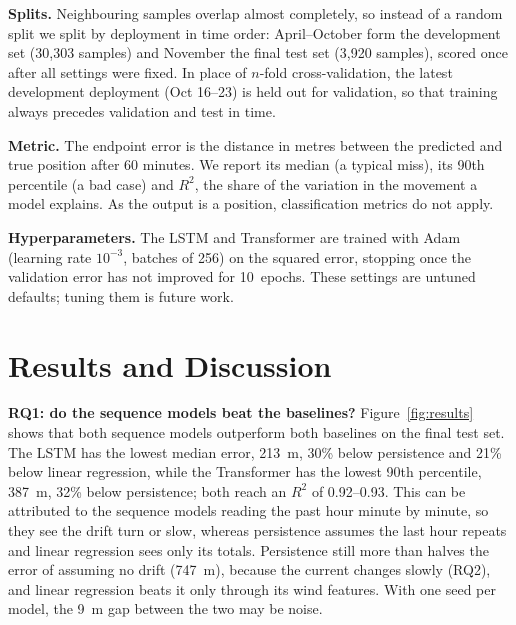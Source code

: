 \documentclass[sigconf]{acmart}
\begin{document}
\textbf{Splits.} Neighbouring samples overlap almost completely, so instead of a random split we split by deployment in time order: April--October form the development set (30{,}303 samples) and November the final test set (3{,}920 samples), scored once after all settings were fixed. In place of $n$-fold cross-validation, the latest development deployment (Oct 16--23) is held out for validation, so that training always precedes validation and test in time.

\textbf{Metric.} The endpoint error is the distance in metres between the predicted and true position after 60 minutes. We report its median (a typical miss), its 90th percentile (a bad case) and $R^2$, the share of the variation in the movement a model explains. As the output is a position, classification metrics do not apply.

\textbf{Hyperparameters.} The LSTM and Transformer are trained with Adam~\cite{kingma2015adam} (learning rate $10^{-3}$, batches of 256) on the squared error, stopping once the validation error has not improved for 10~epochs. These settings are untuned defaults; tuning them is future work.

\section{Results and Discussion}





\textbf{RQ1: do the sequence models beat the baselines?} Figure~\ref{fig:results} shows that both sequence models outperform both baselines on the final test set. The LSTM has the lowest median error, 213~m, 30\% below persistence and 21\% below linear regression, while the Transformer has the lowest 90th percentile, 387~m, 32\% below persistence; both reach an $R^2$ of 0.92--0.93. This can be attributed to the sequence models reading the past hour minute by minute, so they see the drift turn or slow, whereas persistence assumes the last hour repeats and linear regression sees only its totals. Persistence still more than halves the error of assuming no drift (747~m), because the current changes slowly (RQ2), and linear regression beats it only through its wind features. With one seed per model, the 9~m gap between the two may be noise.
\end{document}
